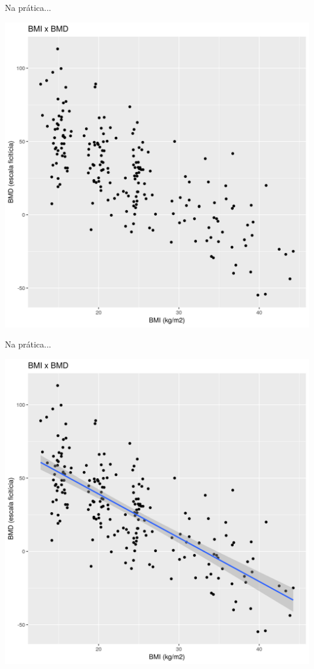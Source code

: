 \documentclass{beamer}
\begin{document}
\begin{frame}{Na prática...}
  \begin{center}
    \includegraphics[height=.9\textheight]{Cap18-19/pratica-plot1}
  \end{center}
\end{frame}

\begin{frame}[label=plot2]{Na prática...}
  \begin{center}
    \includegraphics[height=.9\textheight]{Cap18-19/pratica-plot2}
  \end{center}
\end{frame}
\end{document}
